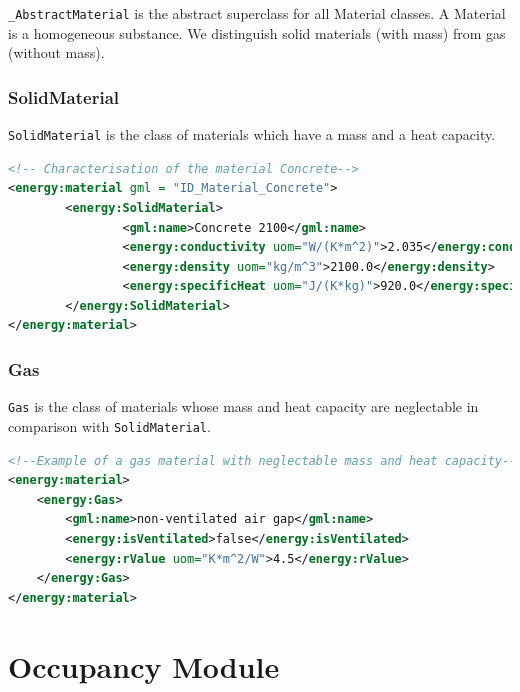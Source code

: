 \documentclass[a4paper,12pt]{article}
\let\stdsection\section%
\renewcommand\section{\newpage\stdsection}
\begin{document}
\lstinline!_AbstractMaterial! is the abstract superclass for all
Material classes. A Material is a homogeneous substance. We distinguish
solid materials (with mass) from gas (without mass).

\subsubsection{SolidMaterial}\label{solidmaterial}

\lstinline!SolidMaterial! is the class of materials which have a mass
and a heat capacity.

\begin{lstlisting}[language=XML]
<!-- Characterisation of the material Concrete-->
<energy:material gml = "ID_Material_Concrete">
        <energy:SolidMaterial>
                <gml:name>Concrete 2100</gml:name>
                <energy:conductivity uom="W/(K*m^2)">2.035</energy:conductivity>
                <energy:density uom="kg/m^3">2100.0</energy:density>
                <energy:specificHeat uom="J/(K*kg)">920.0</energy:specificHeat>
        </energy:SolidMaterial>
</energy:material>
\end{lstlisting}

\subsubsection{Gas}\label{gas}

\lstinline!Gas! is the class of materials whose mass and heat capacity
are neglectable in comparison with \lstinline!SolidMaterial!.

\begin{lstlisting}[language=XML]
<!--Example of a gas material with neglectable mass and heat capacity-->
<energy:material>
    <energy:Gas>
        <gml:name>non-ventilated air gap</gml:name>
        <energy:isVentilated>false</energy:isVentilated>
        <energy:rValue uom="K*m^2/W">4.5</energy:rValue>
    </energy:Gas>
</energy:material>
\end{lstlisting}

\section{Occupancy Module}\label{occupancy-module}
\end{document}
